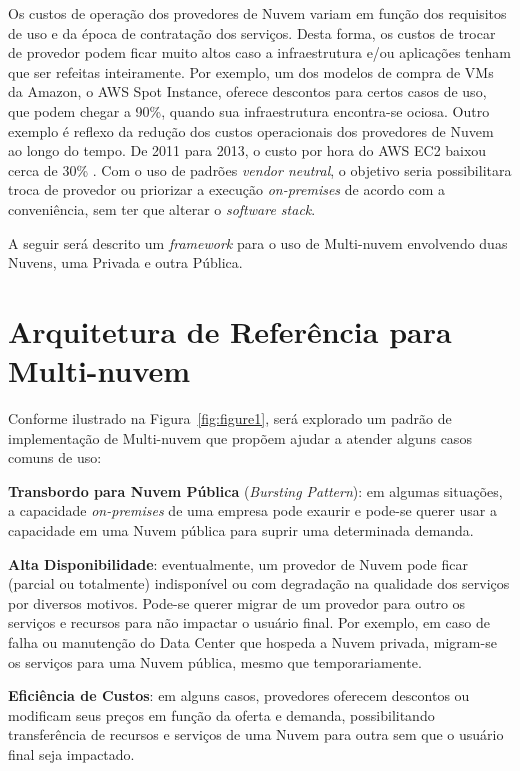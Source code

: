 \documentclass[12pt]{article}
\begin{document}
	Os custos de operação dos provedores de Nuvem variam em função dos requisitos de uso e da época de contratação dos serviços. Desta forma, os custos de trocar de provedor podem ficar muito altos caso a infraestrutura e/ou aplicações tenham que ser refeitas inteiramente. Por exemplo, um dos modelos de compra de VMs da Amazon, o AWS Spot Instance, oferece descontos para certos casos de uso, que podem chegar a 90\%, quando sua infraestrutura encontra-se ociosa. Outro exemplo é reflexo da redução dos custos operacionais dos provedores de Nuvem ao longo do tempo. De 2011 para 2013, o custo por hora do AWS EC2 baixou cerca de 30\% \cite{Golden:2013}. Com o uso de padrões \textit{vendor neutral}, o objetivo seria possibilitara troca de provedor ou priorizar a execução \textit{on-premises} de acordo com a conveniência, sem ter que alterar o \textit{software stack}.
	
	A seguir será descrito um \textit{framework} para o uso de Multi-nuvem envolvendo duas Nuvens, uma Privada e outra Pública. 
	
	\section{Arquitetura de Referência para Multi-nuvem}
	
	Conforme ilustrado na Figura~\ref{fig:figure1}, será explorado um padrão de implementação de Multi-nuvem que propõem ajudar a atender alguns casos comuns de uso:
	
	\textbf{Transbordo para Nuvem Pública} (\textit{Bursting Pattern}): em algumas situações, a capacidade \textit{on-premises} de uma empresa pode exaurir e pode-se querer usar a capacidade em uma Nuvem pública para suprir uma determinada demanda.
	
	\textbf{Alta Disponibilidade}: eventualmente, um provedor de Nuvem pode ficar (parcial ou totalmente) indisponível ou com degradação na qualidade dos serviços por diversos motivos. Pode-se querer migrar de um provedor para outro os serviços e recursos para não impactar o usuário final. Por exemplo, em caso de falha ou manutenção do Data Center que hospeda a Nuvem privada, migram-se os serviços para uma Nuvem pública, mesmo que temporariamente.
	   
	\textbf{Eficiência de Custos}: em alguns casos, provedores oferecem descontos ou modificam seus preços em função da oferta e demanda, possibilitando transferência de recursos e serviços de uma Nuvem para outra sem que o usuário final seja impactado.
	
\end{document}
